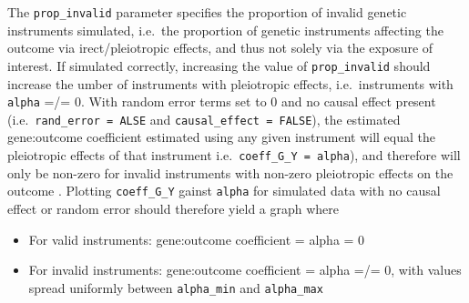 \documentclass[
]{article}
\providecommand{\tightlist}{%
  \setlength{\itemsep}{0pt}\setlength{\parskip}{0pt}}
\begin{document}
The \texttt{prop\_invalid} parameter specifies the proportion of invalid genetic instruments simulated, i.e.~the proportion of genetic instruments affecting the outcome via irect/pleiotropic effects, and thus not solely via the exposure of interest. If simulated correctly, increasing the value of \texttt{prop\_invalid} should increase the umber of instruments with pleiotropic effects, i.e.~instruments with \texttt{alpha} =/= 0. With random error terms set to 0 and no causal effect present (i.e.~\texttt{rand\_error\ =\ ALSE} and \texttt{causal\_effect\ =\ FALSE}), the estimated gene:outcome coefficient estimated using any given instrument will equal the pleiotropic effects of that instrument i.e.~\texttt{coeff\_G\_Y\ =\ alpha}), and therefore will only be non-zero for invalid instruments with non-zero pleiotropic effects on the outcome . Plotting \texttt{coeff\_G\_Y} gainst \texttt{alpha} for simulated data with no causal effect or random error should therefore yield a graph where

\begin{itemize}
\tightlist
\item
  For valid instruments: gene:outcome coefficient = alpha = 0
\item
  For invalid instruments: gene:outcome coefficient = alpha =/= 0, with values spread uniformly between \texttt{alpha\_min} and \texttt{alpha\_max}
\end{itemize}
\end{document}
